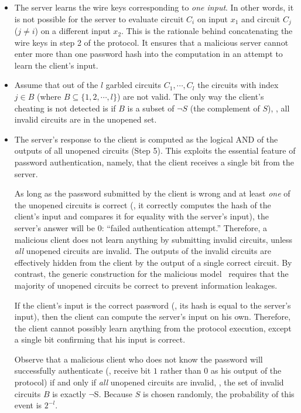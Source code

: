\begin{itemize}

\item 
The server learns the wire keys corresponding to \emph{one input}.
In other words, it is not possible for the server to evaluate circuit
$C_i$ on input $x_1$ and circuit $C_j$ ($j \not= i$) on a different
input $x_2$.  This is the rationale behind concatenating the wire keys
in step 2 of the protocol.  It ensures that a malicious server cannot
enter more than one password hash into the computation in an attempt to
learn the client's input.

\item 
Assume that out of the $l$ garbled circuits $C_1, \cdots , C_l$ the
circuits with index $j \in B$ (where $B \subseteq \{ 1,2, \cdots , l\}$)
are not valid.  The only way the client's cheating is not detected is
if $B$ is a subset of $\neg S$ (the complement of $S$), \ie, all invalid
circuits are in the unopened set.

\item 
The server's response to the client is computed as the logical AND of the
outputs of all unopened circuits (Step 5).  This exploits the essential
feature of password authentication, namely, that the client receives a
single bit from the server.

As long as the password submitted by the client is wrong and at least
\emph{one} of the unopened circuits is correct (\ie, it correctly
computes the hash of the client's input and compares it for equality
with the server's input), the server's answer will be $0$: ``failed
authentication attempt.''  Therefore, a malicious client does not
learn anything by submitting invalid circuits, unless \emph{all}
unopened circuits are invalid.  The outputs of the invalid circuits are
effectively hidden from the client by the output of a single correct
circuit.  By contrast, the generic construction for the malicious
model~\cite{lindellpinkas-eurocrypt07} requires that the majority of
unopened circuits be correct to prevent information leakages.

If the client's input is the correct password (\ie, its hash is equal
to the server's input), then the client can compute the server's input
on his own.  Therefore, the client cannot possibly learn anything from
the protocol execution, except a single bit confirming that his input
is correct.

Observe that a malicious client who does not know the password will
successfully authenticate (\ie, receive bit $1$ rather than $0$ as his
output of the protocol) if and only if \emph{all} unopened circuits
are invalid, \ie, the set of invalid circuits $B$ is exactly $\neg $S.
Because $S$ is chosen randomly, the probability of this event is $2^{-l}$.


\end{itemize}
